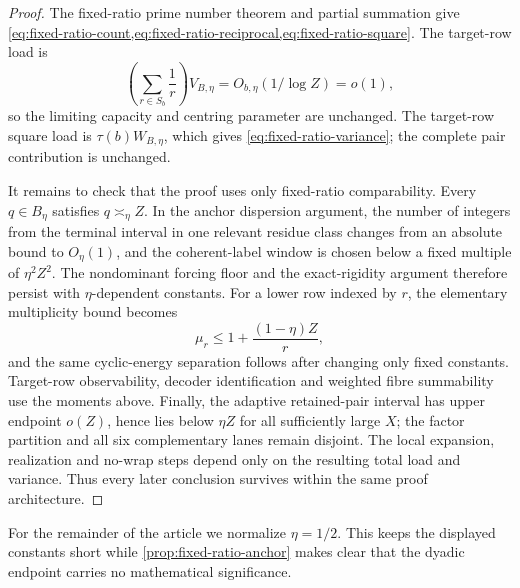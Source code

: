 \begin{proof}
The fixed-ratio prime number theorem and partial summation give \cref{eq:fixed-ratio-count,eq:fixed-ratio-reciprocal,eq:fixed-ratio-square}.  The target-row load is
\[
 \left(\sum_{r\in S_b}\frac1r\right)V_{B,\eta}
 =O_{b,\eta}(1/\log Z)=o(1),
\]
so the limiting capacity and centring parameter are unchanged.  The target-row square load is $\tau(b)W_{B,\eta}$, which gives \cref{eq:fixed-ratio-variance}; the complete pair contribution is unchanged.

It remains to check that the proof uses only fixed-ratio comparability.  Every $q\in B_\eta$ satisfies $q\asymp_\eta Z$.  In the anchor dispersion argument, the number of integers from the terminal interval in one relevant residue class changes from an absolute bound to $O_\eta(1)$, and the coherent-label window is chosen below a fixed multiple of $\eta^2Z^2$.  The nondominant forcing floor and the exact-rigidity argument therefore persist with $\eta$-dependent constants.  For a lower row indexed by $r$, the elementary multiplicity bound becomes
\[
 \mu_r\leq1+\frac{(1-\eta)Z}{r},
\]
and the same cyclic-energy separation follows after changing only fixed constants.  Target-row observability, decoder identification and weighted fibre summability use the moments above.  Finally, the adaptive retained-pair interval has upper endpoint $o(Z)$, hence lies below $\eta Z$ for all sufficiently large $X$; the factor partition and all six complementary lanes remain disjoint.  The local expansion, realization and no-wrap steps depend only on the resulting total load and variance.  Thus every later conclusion survives within the same proof architecture.
\end{proof}

For the remainder of the article we normalize $\eta=1/2$.  This keeps the displayed constants short while \cref{prop:fixed-ratio-anchor} makes clear that the dyadic endpoint carries no mathematical significance.
